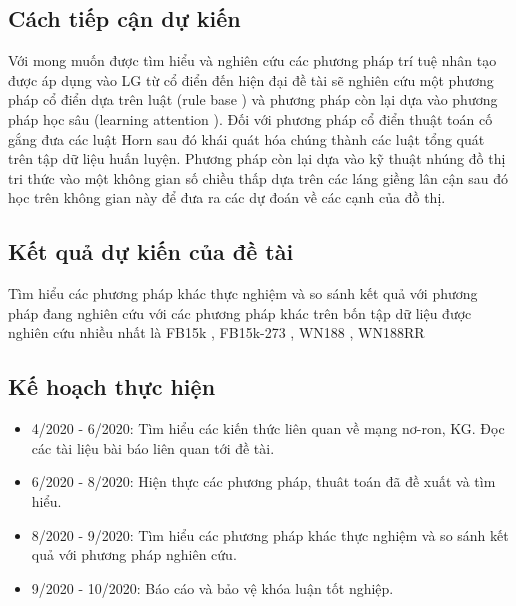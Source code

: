 \documentclass{article}[14pt]
\begin{document}
{    \subsection{Cách tiếp cận dự kiến}
    
    Với mong muốn được tìm hiểu và nghiên cứu các phương pháp trí tuệ nhân tạo được áp dụng vào LG từ cổ điển đến hiện đại đề tài sẽ nghiên cứu một phương pháp cổ điển dựa trên luật (rule base \cite{burl}) và phương pháp còn lại dựa vào phương pháp học sâu (learning attention \cite{gat}). Đối với phương pháp cổ điển thuật toán cố gắng đưa các luật Horn \cite{wiki:Hornclause} sau đó khái quát hóa chúng thành các luật tổng quát trên tập dữ liệu huấn luyện. Phương pháp còn lại dựa vào kỹ thuật nhúng \cite{BordesUGWY13} đồ thị tri thức vào một không gian số chiều thấp dựa trên các láng giềng lân cận \cite{gat} sau đó học trên không gian này để đưa ra các dự đoán về các cạnh của đồ thị.
    
    \subsection{Kết quả dự kiến của đề tài}
    Tìm hiểu các phương pháp khác thực nghiệm và so sánh kết quả với phương pháp đang nghiên cứu với các phương pháp khác trên bốn tập dữ liệu được nghiên cứu nhiều nhất là FB15k \cite{toutanova2015observed}, FB15k-273 \cite{toutanova2015observed}, WN188 \cite{BordesUGWY13}, WN188RR \cite{GEmbedding}
    
    \subsection{Kế hoạch thực hiện}
    \begin{itemize}
        \item 4/2020 - 6/2020: Tìm hiểu các kiến thức liên quan về mạng nơ-ron,  KG. Đọc các  tài liệu bài báo liên quan tới đề tài.
        \item 6/2020 - 8/2020: Hiện thực các phương pháp, thuât toán đã đề xuất và tìm hiểu.
        \item 8/2020 - 9/2020: Tìm hiểu các phương pháp khác thực nghiệm và so sánh kết quả với phương pháp nghiên cứu.
        \item 9/2020 - 10/2020: Báo cáo và bảo vệ khóa luận tốt nghiệp.
    \end{itemize}
    }
    
    
    \nocite{*}
\end{document}

